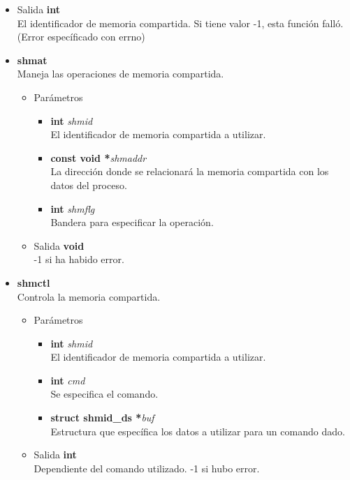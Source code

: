 \begin{itemize}
\begin{tcolorbox}
\begin{itemize}
\begin{itemize}
\begin{itemize}
			\end{itemize}
			\item Salida \textbf{int}\\
			El identificador de memoria compartida. Si tiene valor -1, esta función falló. (Error específicado con errno)
		\end{itemize}
	\end{itemize}
    \end{tcolorbox}
    \begin{tcolorbox}
    \begin{itemize}
    \item \textbf{shmat}\\
    Maneja las operaciones de memoria compartida.
	\begin{itemize}
		\item Parámetros
		\begin{itemize}
			\item \textbf{int} \textit{shmid}\\
		El identificador de memoria compartida a utilizar.
			\item \textbf{const void *}\textit{shmaddr}\\
		La dirección donde se relacionará la memoria compartida con los datos del proceso.
			\item \textbf{int} \textit{shmflg}\\
		Bandera para especificar la operación.
		\end{itemize}
		\item Salida \textbf{void}\\
		-1 si ha habido error.
	\end{itemize}
	\item \textbf{shmctl}\\
	Controla la memoria compartida.
	\begin{itemize}
		\item Parámetros
		\begin{itemize}
			\item \textbf{int} \textit{shmid}\\
		El identificador de memoria compartida a utilizar.
			\item \textbf{int} \textit{cmd}\\
		Se especifica el comando.
			\item \textbf{struct shmid\_ds *}\textit{buf}\\
		Estructura que específica los datos a utilizar para un comando dado.
		\end{itemize}
		\item Salida \textbf{int}\\
		Dependiente del comando utilizado. -1 si hubo error.
	\end{itemize}
    \end{itemize}
    \end{tcolorbox}
\end{itemize}